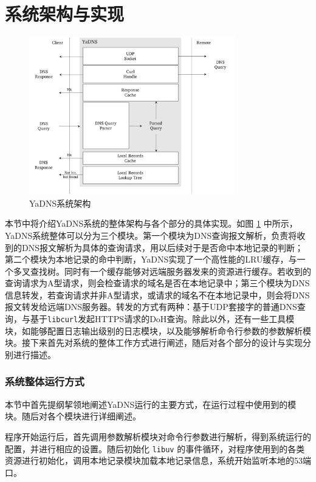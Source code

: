 \part{系统架构与实现}

\begin{figure}[h]
\centering
\includegraphics[width=0.8\textwidth]{figures/sys_arch}
\caption{YaDNS系统架构}
\label{fig:sys-arch}
\end{figure}

本节中将介绍YaDNS系统的整体架构与各个部分的具体实现。如图 \ref{fig:sys-arch} 中所示，YaDNS系统整体可以分为三个模块。第一个模块为DNS查询报文解析，负责将收到的DNS报文解析为具体的查询请求，用以后续对于是否命中本地记录的判断；第二个模块为本地记录的命中判断，YaDNS实现了一个高性能的LRU缓存，与一个多叉查找树。同时有一个缓存能够对远端服务器发来的资源进行缓存。若收到的查询请求为A型请求，则会检查请求的域名是否在本地记录中；第三个模块为DNS信息转发，若查询请求并非A型请求，或请求的域名不在本地记录中，则会将DNS报文转发给远端DNS服务器。转发的方式有两种：基于UDP套接字的普通DNS查询，与基于\lstinline{libcurl}发起HTTPS请求的DoH查询。除此以外，还有一些工具模块，如能够配置日志输出级别的日志模块，以及能够解析命令行参数的参数解析模块。接下来首先对系统的整体工作方式进行阐述，随后对各个部分的设计与实现分别进行描述。

\section{系统整体运行方式}

本节中首先提纲挈领地阐述YaDNS运行的主要方式，在运行过程中使用到的模块。随后对各个模块进行详细阐述。

程序开始运行后，首先调用参数解析模块对命令行参数进行解析，得到系统运行的配置，并进行相应的设置。随后初始化 \lstinline{libuv} 的事件循环，对程序使用到的各类资源进行初始化，调用本地记录模块加载本地记录信息，系统开始监听本地的53端口。

